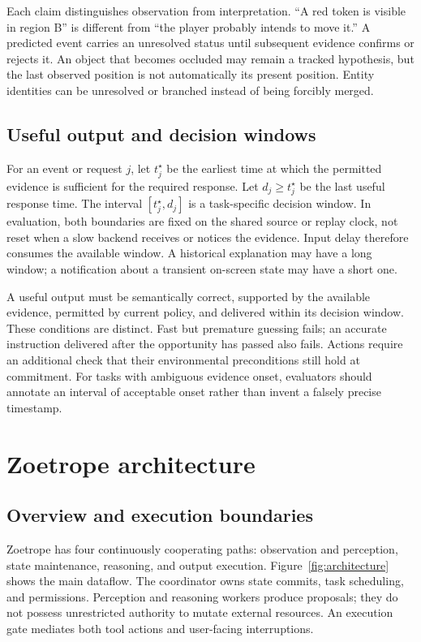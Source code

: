 \documentclass[11pt,letterpaper]{article}
\begin{document}
Each claim distinguishes observation from interpretation. ``A red token is visible in region B'' is different from ``the player probably intends to move it.'' A predicted event carries an unresolved status until subsequent evidence confirms or rejects it. An object that becomes occluded may remain a tracked hypothesis, but the last observed position is not automatically its present position. Entity identities can be unresolved or branched instead of being forcibly merged.

\subsection{Useful output and decision windows}
For an event or request $j$, let $t_j^\star$ be the earliest time at which the permitted evidence is sufficient for the required response. Let $d_j\geq t_j^\star$ be the last useful response time. The interval $[t_j^\star,d_j]$ is a task-specific decision window. In evaluation, both boundaries are fixed on the shared source or replay clock, not reset when a slow backend receives or notices the evidence. Input delay therefore consumes the available window. A historical explanation may have a long window; a notification about a transient on-screen state may have a short one.

A useful output must be semantically correct, supported by the available evidence, permitted by current policy, and delivered within its decision window. These conditions are distinct. Fast but premature guessing fails; an accurate instruction delivered after the opportunity has passed also fails. Actions require an additional check that their environmental preconditions still hold at commitment. For tasks with ambiguous evidence onset, evaluators should annotate an interval of acceptable onset rather than invent a falsely precise timestamp.

\section{Zoetrope architecture}
\subsection{Overview and execution boundaries}
Zoetrope has four continuously cooperating paths: observation and perception, state maintenance, reasoning, and output execution. Figure~\ref{fig:architecture} shows the main dataflow. The coordinator owns state commits, task scheduling, and permissions. Perception and reasoning workers produce proposals; they do not possess unrestricted authority to mutate external resources. An execution gate mediates both tool actions and user-facing interruptions.
\end{document}
